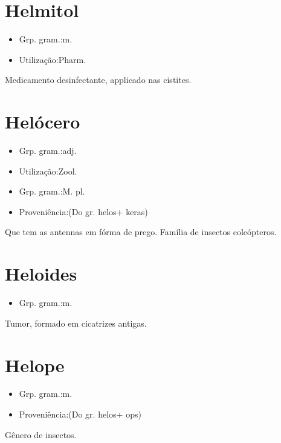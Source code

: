 \documentclass{article}
\begin{document}
\section{Helmitol}
\begin{itemize}
\item {Grp. gram.:m.}
\end{itemize}
\begin{itemize}
\item {Utilização:Pharm.}
\end{itemize}
Medicamento desinfectante, applicado nas cistites.
\section{Helócero}
\begin{itemize}
\item {Grp. gram.:adj.}
\end{itemize}
\begin{itemize}
\item {Utilização:Zool.}
\end{itemize}
\begin{itemize}
\item {Grp. gram.:M. pl.}
\end{itemize}
\begin{itemize}
\item {Proveniência:(Do gr. \textunderscore helos\textunderscore  + \textunderscore keras\textunderscore )}
\end{itemize}
Que tem as antennas em fórma de prego.
Família de insectos coleópteros.
\section{Heloides}
\begin{itemize}
\item {Grp. gram.:m.}
\end{itemize}
Tumor, formado em cicatrizes antigas.
\section{Helope}
\begin{itemize}
\item {Grp. gram.:m.}
\end{itemize}
\begin{itemize}
\item {Proveniência:(Do gr. \textunderscore helos\textunderscore  + \textunderscore ops\textunderscore )}
\end{itemize}
Gênero de insectos.
\end{document}
